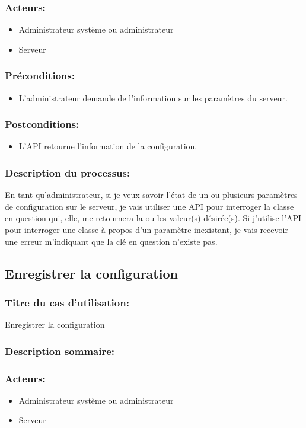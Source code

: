 \documentclass{scrreprt}
\begin{document}
\subsubsection{Acteurs:}
\begin{itemize}
	\item Administrateur système ou administrateur
    \item Serveur
\end{itemize}
\subsubsection{Préconditions:}
\begin{itemize}
    \item L'administrateur demande de l'information sur les paramètres du serveur.
\end{itemize} 
\subsubsection{Postconditions:}
\begin{itemize}
    \item  L'API retourne l'information de la configuration.    
\end{itemize} 
\subsubsection{Description du processus:}En tant qu'administrateur, si je veux savoir l'état de un ou plusieurs paramètres de
configuration sur le serveur, je vais utiliser une API pour interroger la
classe en question qui, elle, me retournera la ou les valeur(s) désirée(s).
Si j'utilise l'API pour interroger une classe à propos d'un paramètre
inexistant, je vais recevoir une erreur m'indiquant que la clé en question
n'existe pas.

\subsection{Enregistrer la configuration}
\subsubsection{Titre du cas d'utilisation:} Enregistrer la configuration
\subsubsection{Description sommaire:}
\subsubsection{Acteurs:}
\begin{itemize}
	\item Administrateur système ou administrateur
    \item Serveur
\end{itemize}
\end{document}
